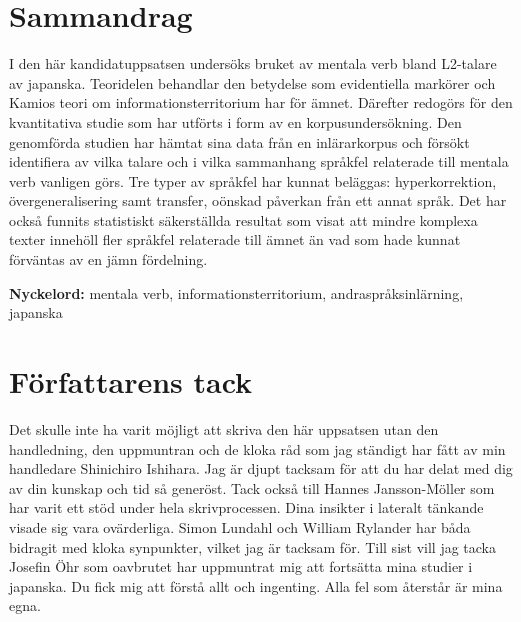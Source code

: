 \documentclass[12pt,a4paper]{article}
\begin{document}
\section*{Sammandrag}
I den här kandidatuppsatsen undersöks bruket av mentala verb bland L2-talare av japanska. Teoridelen behandlar den betydelse som evidentiella markörer och Kamios teori om informationsterritorium har för ämnet. Därefter redogörs för den kvantitativa studie som har utförts i form av en korpusundersökning. Den genomförda studien har hämtat sina data från en inlärarkorpus och försökt identifiera av vilka talare och i vilka sammanhang språkfel relaterade till mentala verb vanligen görs. Tre typer av språkfel har kunnat beläggas: hyperkorrektion, övergeneralisering samt transfer, oönskad påverkan från ett annat språk. Det har också funnits statistiskt säkerställda resultat som visat att mindre komplexa texter innehöll fler språkfel relaterade till ämnet än vad som hade kunnat förväntas av en jämn fördelning.

\bigskip
\noindent
\textbf{Nyckelord:} mentala verb, informationsterritorium, andraspråksinlärning, japanska

\vfill
\doclicenseThis




\newpage
\section*{Författarens tack}
Det skulle inte ha varit möjligt att skriva den här uppsatsen utan den handledning, den uppmuntran och de kloka råd som jag ständigt har fått av min handledare Shinichiro Ishihara. Jag är djupt tacksam för att du har delat med dig av din kunskap och tid så generöst. Tack också till Hannes Jansson-Möller som har varit ett stöd under hela skrivprocessen. Dina insikter i lateralt tänkande visade sig vara ovärderliga. Simon Lundahl och William Rylander har båda bidragit med kloka synpunkter, vilket jag är tacksam för. Till sist vill jag tacka Josefin Öhr som oavbrutet har uppmuntrat mig att fortsätta mina studier i japanska. Du fick mig att förstå allt och ingenting. Alla fel som återstår är mina egna.




\clearpage
\end{document}
